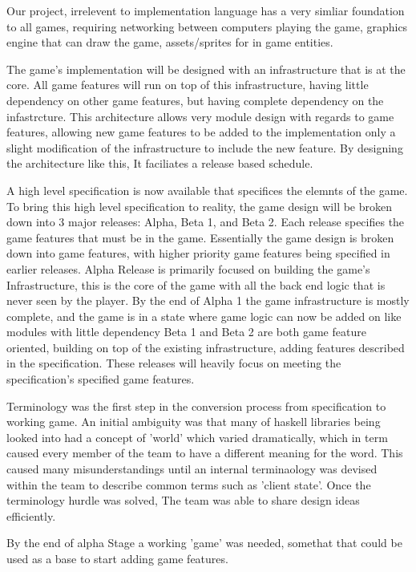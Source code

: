


Our project, irrelevent to implementation language has a very simliar foundation to all games, requiring networking between computers playing the game, graphics engine that can draw the game, assets/sprites for in game entities.

The game's implementation will be designed with an infrastructure that is at the core. All game features will run on top of this infrastructure, having little dependency on other game features, but having complete dependency on the infastrcture. This architecture allows very module design with regards to game features, allowing new game features to be added to the implementation only a slight modification of the infrastructure to include the new feature. By designing the architecture like this, It faciliates a release based schedule.

A high level specification is now available that specifices the elemnts of the game. To bring this high level specification to reality, the game design will be broken down into 3 major releases: Alpha, Beta 1, and Beta 2. Each release specifies the game features that must be in the game. Essentially the game design is broken down into game features, with higher priority game features being specified in earlier releases.
Alpha Release is primarily focused on building the game's Infrastructure, this is the core of the game with all the back end logic that is never seen by the player. By the end of Alpha 1 the game infrastructure is mostly complete, and the game is in a state where game logic can now be added on like modules with little dependency 
Beta 1 and Beta 2 are both game feature oriented, building on top of the existing infrastructure, adding features described in the specification. These releases will heavily focus on meeting the specification's specified game features.

Terminology was the first step in the conversion process from specification to working game. 
An initial ambiguity was that many of haskell libraries being looked into had a concept of 'world' which varied dramatically, which in term caused every member of the team to have a different meaning for the word. This caused many misunderstandings until an internal terminaology was devised within the team to describe common terms such as 'client state'. Once the terminology hurdle was solved, The team was able to share design ideas efficiently.

By the end of alpha Stage a working 'game' was needed, somethat that could be used as a base to start adding game features.

